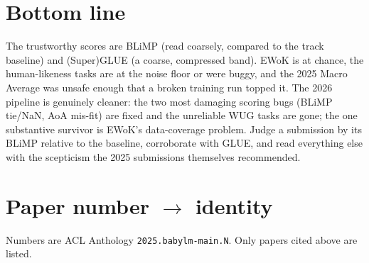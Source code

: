 \documentclass[11pt]{article}
\begin{document}
\section{Bottom line}
The trustworthy scores are BLiMP (read coarsely, compared to the track baseline) and (Super)GLUE (a coarse,
compressed band). EWoK is at chance, the human-likeness tasks are at the noise floor or were buggy, and the
2025 Macro Average was unsafe enough that a broken training run topped it. The 2026 pipeline is genuinely
cleaner: the two most damaging scoring bugs (BLiMP tie/NaN, AoA mis-fit) are fixed and the unreliable WUG
tasks are gone; the one substantive survivor is EWoK's data-coverage problem. Judge a submission by its BLiMP
relative to the baseline, corroborate with GLUE, and read everything else with the scepticism the 2025
submissions themselves recommended.

\appendix
\section{Paper number $\to$ identity}
\label{app:papers}
Numbers are ACL Anthology \texttt{2025.babylm-main.N}. Only papers cited above are listed.

\newcommand{\pp}[2]{\textbf{m.#1}~#2}
\end{document}
